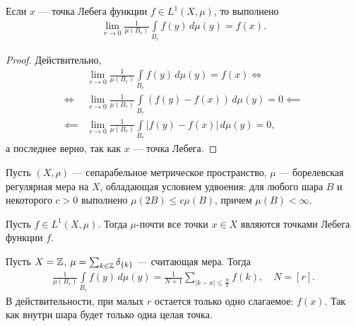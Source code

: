 
\begin{remrk}
 Если $x$ --- точка Лебега функции $f \in L^{1}(X,\mu)$, то выполнено \begin{align*}
  \lim_{r \to 0} \frac{1}{\mu(B_r)} \int\limits_{B_r} f(y) \, d\mu(y) = f(x)
 .\end{align*} 
\end{remrk}
\begin{proof}
 Действительно, \begin{align*}
  &\lim_{r \to 0}  \frac{1}{\mu(B_r)} \int\limits_{B_r} f(y) \, d\mu (y) = f(x) \iff \\
  \iff &\lim_{r \to 0} \frac{1}{\mu(B_r)} \int\limits_{B_r} (f(y) - f(x)) \, d\mu  (y) = 0 \impliedby \\
  \impliedby &\lim_{r \to 0}  \frac{1}{\mu(B_r)} \int\limits_{B_r} \left| f(y) - f(x) \right| \, d\mu(y) = 0
, \end{align*} а последнее верно, так как $x$ --- точка Лебега.
\end{proof}

\begin{thm}[%
]
\label{theorem:almost_all_points_are_lebesgue_points}
 Пусть $(X, \rho)$ --- сепарабельное метрическое пространство, $\mu$ --- борелевская регулярная мера на $X$, обладающая условием удвоения: для любого шара $B$ и некоторого $c > 0$ выполнено $\mu(2B) \leqslant c \mu(B)$, причем $\mu(B) < \infty$.

 Пусть $f \in L^{1}(X,\mu)$. Тогда $\mu$-почти все точки $x \in X$ являются точками Лебега функции $f$.
\end{thm}
\begin{remrk}
 Пусть $X = \mathbb{Z}$, $\mu = \sum_{k \in \mathbb{Z}} \delta_{\left\{ k \right\}}$ --- считающая мера. Тогда \begin{align*}
  \frac{1}{\mu(B_r)} \int\limits_{B_r} f(y) \, d\mu  (y) = \frac{1}{N + 1} \sum_{\left| k - x \right| \leqslant \frac{N}{2}} f(k), \quad N = [r]
 .\end{align*} В действительности, при малых $r$ остается только одно слагаемое: $f(x)$. Так как внутри шара будет только одна целая точка.
\end{remrk}

